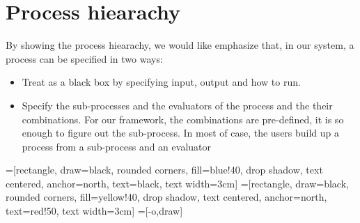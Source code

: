 \documentclass{report}
\begin{document}
\section{Process hiearachy}
\par By showing  the process hiearachy, we would like emphasize that, in our system, a process can be specified 
in two ways:
\begin{itemize}
\item Treat as a black box by specifying input, output and how to run.
\item Specify the sub-processes and the evaluators of the process and the their combinations. For our 
framework, the combinations are pre-defined, it is so enough to figure out the sub-process. In most of case, 
the users build up a process from a sub-process and an evaluator 
\end{itemize}
=[rectangle, draw=black, rounded corners, fill=blue!40, drop shadow,
        text centered, anchor=north, text=black, text width=3cm]
=[rectangle, draw=black, rounded corners, fill=yellow!40, drop shadow,
        text centered, anchor=north, text=red!50, text width=3cm]
=[-o,draw]
\end{document}

